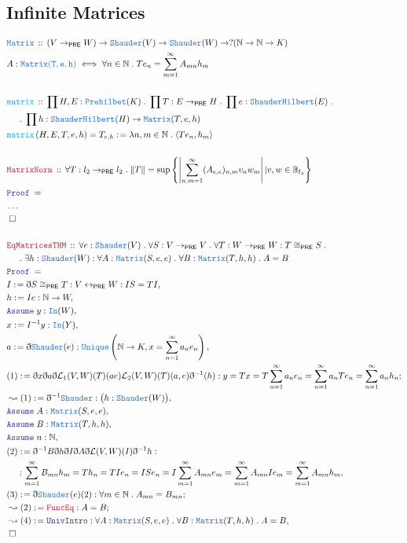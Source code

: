 \documentclass[12pt]{scrartcl}
\newcommand{\TYPE}[1]{\textcolor{NavyBlue}{\mathtt{#1}}}
\newcommand{\FUNC}[1]{\textcolor{Cerulean}{\mathtt{#1}}}
\newcommand{\LOGIC}[1]{\textcolor{Blue}{\mathtt{#1}}}
\newcommand{\THM}[1]{\textcolor{Maroon}{\mathtt{#1}}}
\renewcommand{\.}{\; . \;}
\newcommand{\de}{: \kern 0.1pc =}
\newcommand{\Act}[1]{\left( #1 \right)}
\newcommand{\Theorem}[2]{& \THM{#1} \, :: \, #2 \\ & \Proof = \\ }
\newcommand{\DeclareType}[2]{& \TYPE{#1} \, :: \, #2 \\}
\newcommand{\DefineType}[3]{& #1 : \TYPE{#2} \iff #3 \\}
\newcommand{\DeclareFunc}[2]{& \FUNC{#1} \, :: \, #2 \\}
\newcommand{\DefineNamedFunc}[4]{&  \FUNC{#1}\Act{#2} = #3 \de #4 \\}
\newcommand{\NewLine}{\\ & \kern 1pc}
\newcommand{\Page}[1]{\begin{align*} #1 \end{align*} \newpage   }
\newcommand{ \bd }{ \ByDef }
\newcommand{\NoProof}{ & \ldots \\ \EndProof}
\newcommand{\Nat}{\mathbb{N} }
\newcommand{\ToBij}{\leftrightarrow}
\newcommand{\Say}[3]{& #1 \de #2 : #3, \\}
\newcommand{\Conclude}[3]{& #1 \de #2 : #3; \\}
\newcommand{\Derive}[3]{& \leadsto #1 \de #2 : #3, \\}
\newcommand{\DeriveConclude}[3]{& \leadsto #1 \de #2 : #3 ; \\}
\newcommand{\A}{\LOGIC{Assume} \;}
\newcommand{\Assume}[2]{& \A #1 : #2, \\}
\newcommand{\QED}{\; \square}
\newcommand{\EndProof}{& \QED \\}
\newcommand{\ByDef}{\eth}
\newcommand{\Proof}{\LOGIC{Proof} \; }
\newcommand{\Ball}{ \mathbb{B} }
\newcommand{\PRE}{\mathsf{PRE}} %
\begin{document}
 \subsection{Infinite Matrices}
 \Page
 {
  \DeclareType{Matrix}{ (V \to_\PRE W) \to \TYPE{Shauder}(V) \to \TYPE{Shauder}(W) \to ?(\Nat \to \Nat \to K) }
  \DefineType{A}{Matrix(T,e,h)}{ \forall n \in \Nat \. Te_n = \sum^\infty_{m = 1} A_{mn}h_m }
  \\
  \DeclareFunc{matrix}{ \prod H,E : \TYPE{Prehilbet}(K) \. \prod T : E \to_\PRE H \. \prod
  e : \TYPE{ShauderHilbert}(E) \. 
  \NewLine \.  
  \prod  h  : \TYPE{ShauderHilbert}(H) \to \TYPE{Matrix}(T,e,h) }
  \DefineNamedFunc{matrix}{H,E,T,e,h}{T_{e,h}}{ \lambda n,m \in \Nat \. \langle Te_n, h_m \rangle }
  \\
  \Theorem{MatrixNorm}{\forall T : l_2 \to_\PRE l_2 \. 
  \| T \| = \sup \left\{  \left| \sum^\infty_{n,m = 1} (A_{e,e})_{n,m} v_n w_m  \right| 
   | v,w \in \Ball_{l_2} \right\}  
   }
   \NoProof
  \\
  \Theorem{EqMatricesTHM}{ \forall e : \TYPE{Shauder}(V) \. \forall S : V \to_\PRE V \.
   \forall T : W \to_\PRE W : T \cong_\PRE S \. 
   \NewLine \.
   \exists h : \TYPE{Shauder}(W) : \forall A : \TYPE{Matrix}(S,e,e) \.  
   \forall B : \TYPE{Matrix}(T,h,h) \. A = B
   }
   \Say{I}{ \bd  S \cong_\PRE T }{ V \ToBij_\PRE W  : IS = TI}
   \Say{h}{Ie}{ \Nat \to W}
   \Assume{y}{\TYPE{In}(W)}
   \Say{x}{I^{-1}y}{\TYPE{In}(Y)}
   \Say{a}{ \bd \TYPE{Shauder} (e) }{ \TYPE{Unique}
   \left(\Nat \to K , x = \sum^\infty_{n = 1} a_n e_n \right) }
   \Conclude{(1)}{ \bd x \bd a \bd \mathcal{L}_1(V,W)(T)(ae)
      \mathcal{L}_2(V,W)(T)(a,e) \bd^{-1}(h)                               
    }{  y = Tx = T \sum^\infty_{n = 1} a_n e_n = \sum^\infty_{n = 1} a_n T e_n  
     =    \sum^\infty_{n = 1} a_n h_n
   }
   \Derive{(1)}{\bd^{-1} \TYPE{Shauder}}{\big(h : \TYPE{Shauder}(W) \big)}
   \Assume{A}{\TYPE{Matrix}(S,e,e)}
   \Assume{B}{\TYPE{Matrix}(T,h,h)}
   \Assume{n}{\Nat}
   \Say{(2)}{ \bd^{-1} B \bd h \bd I \bd A \bd \mathcal{L}(V,W)(I)\bd^{-1} h}
   { \NewLine : \sum^\infty_{m=1} B_{mn} h_m = T h_n = T I e_n = I Se_n = I\sum^\infty_{m=1} A_{mn} e_m
    =  \sum^\infty_{m=1} A_{mn} I e_m = \sum^\infty_{m=1} A_{mn} h_m  }
   \Conclude{ (3) }{ \bd \TYPE{Shauder}(e)(2) }{ \forall m \in \Nat \. A_{mn} = B_{mn}}
   \DeriveConclude{ (2) }{\THM{FuncEq}}{ A = B }
   \Derive{ (4) }{ \LOGIC{UnivIntro} }{ \forall A : \TYPE{Matrix}(S,e,e) \.  
   \forall B : \TYPE{Matrix}(T,h,h) \. A = B }
   \EndProof
 }
\end{document}
